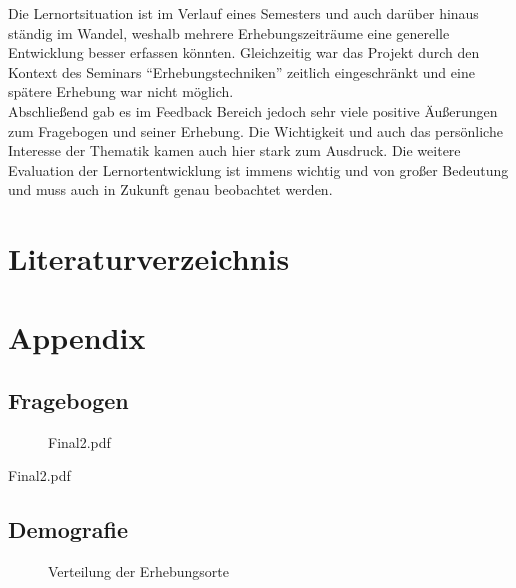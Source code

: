 \documentclass[11pt, a4paper]{article}
\begin{document}
Die Lernortsituation ist im Verlauf eines Semesters und auch darüber hinaus ständig im Wandel, weshalb mehrere Erhebungszeiträume eine generelle Entwicklung besser erfassen könnten. Gleichzeitig war das Projekt durch den Kontext des Seminars “Erhebungstechniken” zeitlich eingeschränkt und eine spätere Erhebung war nicht möglich.\\
Abschließend gab es im Feedback Bereich jedoch sehr viele positive Äußerungen zum Fragebogen und seiner Erhebung. Die Wichtigkeit und auch das persönliche Interesse der Thematik kamen auch hier stark zum Ausdruck. Die weitere Evaluation der Lernortentwicklung ist immens wichtig und von großer Bedeutung und muss auch in Zukunft genau beobachtet werden.


\newpage
\newpage
\section{Literaturverzeichnis}
\printbibliography
\newpage
\section{Appendix}
\subsection{Fragebogen}
\begin{figure}[h]
 {Final2.pdf}
\end{figure}
\newpage
 {Final2.pdf}
\newpage
\subsection{Demografie}
\begin{figure}[h]
	\centering
	
	\caption{Verteilung der Erhebungsorte}
\end{figure}
\end{document}
